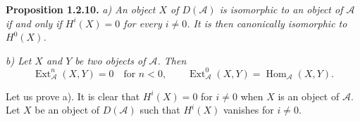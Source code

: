 \medskip\noindent\textbf{Proposition 1.2.10.}\quad
\textit{a) An object $X$ of $D(\mathcal A)$ is isomorphic to an object of
$\mathcal A$ if and only if $H^i(X)=0$ for every $i\neq0$. It is then
canonically isomorphic to $H^0(X)$.}

\noindent\textit{b) Let $X$ and $Y$ be two objects of $\mathcal A$. Then}
\[
\operatorname{Ext}_{\mathcal A}^{n}(X,Y)=0\quad\text{for }n<0,
\qquad
\operatorname{Ext}_{\mathcal A}^{0}(X,Y)
=\operatorname{Hom}_{\mathcal A}(X,Y).
\]

Let us prove a). It is clear that $H^i(X)=0$ for $i\neq0$ when $X$ is an
object of $\mathcal A$. Let $X$ be an object of $D(\mathcal A)$ such that
$H^i(X)$ vanishes for $i\neq0$.
\endgroup

